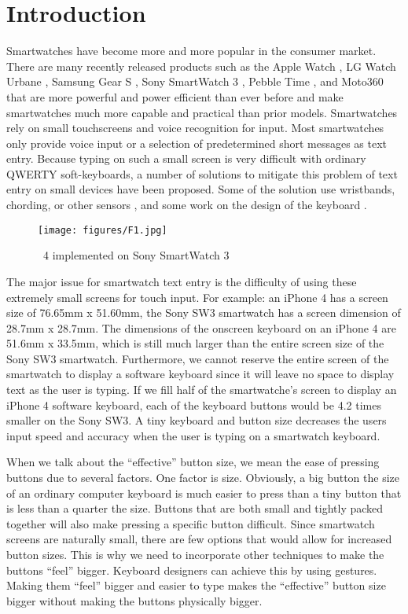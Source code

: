 \section{Introduction}
Smartwatches have become more and more popular in the consumer market. There are many recently released products such as the Apple Watch \cite{apple-watch}, LG Watch Urbane \cite{lg-urban}, Samsung Gear S \cite{samsung-gear-s}, Sony SmartWatch 3 \cite{sony-sw3}, Pebble Time \cite{pebble-time}, and Moto360 \cite{moto360} that are more powerful and power efficient than ever before and make smartwatches much more capable and practical than prior models. 
Smartwatches rely on small touchscreens and voice recognition for input. Most smartwatches only provide voice input or a selection of predetermined short messages as text entry. Because typing on such a small screen is very difficult with ordinary QWERTY soft-keyboards, a number of solutions to mitigate this problem of text entry on small devices have been proposed. Some of the solution use wristbands, chording, or other sensors  \cite{wristband-text-entry,one-hand-chording,tilt-type,airwriting-on-wearable,mid-air-gesture}, and some work on the design of the keyboard \cite{text-entry-on-small-qwerty,text-entry-for-mobile,zoomboard,1-line-qwerty,splitboard}.

\begin{figure}
  \centering
  \texttt{[image: figures/F1.jpg]}
  \caption{\papertitle\ 4 implemented on Sony SmartWatch 3}
  \label{fig:f1}
\end{figure}

The major issue for smartwatch text entry is the difficulty of using these extremely small screens for touch input. For example: an iPhone 4 has a screen size of 76.65mm x 51.60mm, the Sony SW3 smartwatch has a screen dimension of 28.7mm x 28.7mm. The dimensions of the onscreen keyboard on an iPhone 4 are 51.6mm x 33.5mm, which is still much larger than the entire screen size of the Sony SW3 smartwatch. Furthermore, we cannot reserve the entire screen of the smartwatch to display a software keyboard since it will leave no space to display text as the user is typing. If we fill half of the smartwatche's screen to display an iPhone 4 software keyboard, each of the keyboard buttons would be 4.2 times smaller on the Sony SW3. A tiny keyboard and button size decreases the users input speed and accuracy when the user is typing on a smartwatch keyboard.

When we talk about the “effective” button size, we mean the ease of pressing buttons due to several factors. One factor is size. Obviously, a big button the size of an ordinary computer keyboard is much easier to press than a tiny button that is less than a quarter the size. Buttons that are both small and tightly packed together will also make pressing a specific button difficult. Since smartwatch screens are naturally small, there are few options that would allow for increased button sizes. This is why we need to incorporate other techniques to make the buttons “feel” bigger. Keyboard designers can achieve this by using gestures. Making them “feel” bigger and easier to type makes the “effective” button size bigger without making the buttons physically bigger.

